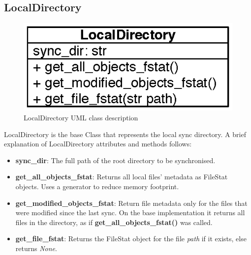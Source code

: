   \subsection{LocalDirectory}
    \begin{figure}[!htpb]
      \centering
      \includegraphics{Images/LocalDir.eps}
      \caption{LocalDirectory UML class description}
      \label{fig:localdir_uml}
    \end{figure}
    LocalDirectory is the base Class that represents the local sync directory. A brief explanation of LocalDirectory attributes and methods follows:
    \begin{itemize}
      \item \textbf{sync\_dir}: The full path of the root directory to be synchronised.\\

      \item \textbf{get\_all\_objects\_fstat}: Returns all local files' metadata as FileStat objects. Uses a generator to reduce memory footprint.
      \item \textbf{get\_modified\_objects\_fstat}: Return file metadata only for the files that were modified since the last sync. On the base implementation it returns all files in the directory, as if \textbf{get\_all\_objects\_fstat()} was called.
      \item \textbf{get\_file\_fstat}: Returns the FileStat object for the file \emph{path} if it exists, else returns \emph{None}.
    \end{itemize}

